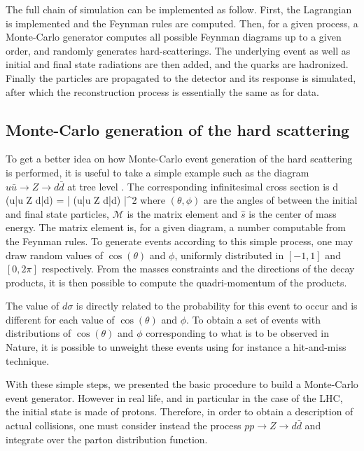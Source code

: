     The full chain of simulation can be implemented as follow. First, the Lagrangian
    is implemented and the Feynman rules are computed. Then, for a given process, a
    Monte-Carlo generator computes all possible Feynman diagrams up to a given order, and
    randomly generates hard-scatterings. The underlying event as well as initial and final
    state radiations are then added, and the quarks are hadronized. Finally the particles
    are propagated to the detector and its response is simulated, after which the
    reconstruction process is essentially the same as for data.

    \subsection{Monte-Carlo generation of the hard scattering}

    To get a better idea on how Monte-Carlo event generation of the hard scattering
    is performed, it is useful to take a simple example such as the diagram
    $u\bar{u} \rightarrow Z \rightarrow d\bar{d}$ at tree level \cite{MCGenLesHouches}. The corresponding
    infinitesimal cross section is
    {
        d \sigma(u\bar{u} \rightarrow Z \rightarrow d\bar{d})
        =
        \left|
            (u\bar{u} \rightarrow Z \rightarrow d\bar{d})
        \right|^2
    }
    where $(\theta,\phi)$ are the angles of between the initial and final state particles,
    $\mathcal{M}$ is the matrix element and $\hat{s}$ is the center of mass energy. The
    matrix element is, for a given diagram, a number computable from the Feynman rules.
    To generate events according to this simple process, one may draw random
    values of $\cos(\theta)$ and $\phi$, uniformly distributed in $[-1, 1]$ and
    $[0,2\pi]$ respectively. From the masses constraints and the directions of the
    decay products, it is then possible to compute the quadri-momentum of the products.

    The value of $d\sigma$ is directly related to the probability for this event
    to occur and is different for each value of $\cos(\theta)$ and $\phi$. To obtain
    a set of events with distributions of $\cos(\theta)$ and $\phi$ corresponding to
    what is to be observed in Nature, it is possible to unweight these events using
    for instance a hit-and-miss technique.

    With these simple steps, we presented the basic procedure to build a Monte-Carlo
    event generator. However in real life, and in particular in the case of the
    LHC, the initial state is made of protons. Therefore, in order to obtain a
    description of actual collisions, one must consider instead the process
    $pp \rightarrow Z \rightarrow d\bar{d}$ and integrate over the parton distribution
    function.

